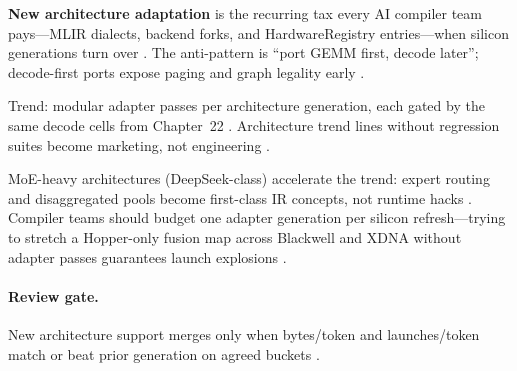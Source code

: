 \textbf{New architecture adaptation} is the recurring tax every AI compiler team pays---MLIR dialects, backend forks, and HardwareRegistry entries---when silicon generations turn over \citep{chen2020compilerbasedhardw,yirage2026,amd2024xdna,amd2024aie,semianalysis2024tma,nvidia2022hopper,patel2025llminference,kwon2023vllm,liu2024deepseekv3,memoryfloor2026,taxbreak2026,dlbook,dao2022flashattention,dao2023flashdecoding,nvidia2024cudagraphs,dlbook}. The anti-pattern is ``port GEMM first, decode later''; decode-first ports expose paging and graph legality early \citep{patel2025llminference,memoryfloor2026,taxbreak2026,kwon2023vllm,yirage2026,chen2020compilerbasedhardw,liu2024deepseekv3,amd2024aie,dlbook,semianalysis2024tma,amd2024xdna,dao2022flashattention,dao2023flashdecoding,nvidia2024cudagraphs,nvidia2022hopper}.

Trend: modular adapter passes per architecture generation, each gated by the same decode cells from Chapter~22 \citep{chen2020compilerbasedhardw,yirage2026,patel2025llminference,memoryfloor2026,taxbreak2026,kwon2023vllm,liu2024deepseekv3,amd2024aie,dlbook,semianalysis2024tma,amd2024xdna,dao2022flashattention,dao2023flashdecoding,nvidia2024cudagraphs,nvidia2022hopper,amd2024xdna}. Architecture trend lines without regression suites become marketing, not engineering \citep{patel2025llminference,yirage2026,chen2020compilerbasedhardw,kwon2023vllm,memoryfloor2026,taxbreak2026,liu2024deepseekv3,amd2024aie,dlbook,semianalysis2024tma,amd2024xdna,dao2022flashattention,dao2023flashdecoding,nvidia2024cudagraphs,nvidia2022hopper}.

MoE-heavy architectures (DeepSeek-class) accelerate the trend: expert routing and disaggregated pools become first-class IR concepts, not runtime hacks \citep{liu2024deepseekv3,patel2025llminference,taxbreak2026,yirage2026,chen2020compilerbasedhardw,kwon2023vllm,memoryfloor2026,amd2024aie,dlbook,semianalysis2024tma,amd2024xdna,dao2022flashattention,dao2023flashdecoding,nvidia2024cudagraphs,nvidia2022hopper}. Compiler teams should budget one adapter generation per silicon refresh---trying to stretch a Hopper-only fusion map across Blackwell and XDNA without adapter passes guarantees launch explosions \citep{taxbreak2026,semianalysis2024tma,amd2024xdna,amd2024aie,yirage2026,chen2020compilerbasedhardw,patel2025llminference,kwon2023vllm,liu2024deepseekv3,memoryfloor2026,dlbook,dao2022flashattention,dao2023flashdecoding,nvidia2024cudagraphs,nvidia2022hopper,amd2024xdna}. \paragraph{Review gate.} New architecture support merges only when bytes/token and launches/token match or beat prior generation on agreed buckets \citep{memoryfloor2026,patel2025llminference,yirage2026,chen2020compilerbasedhardw,kwon2023vllm,liu2024deepseekv3,taxbreak2026,amd2024aie,dlbook,semianalysis2024tma,amd2024xdna,dao2022flashattention,dao2023flashdecoding,nvidia2024cudagraphs,nvidia2022hopper}.

